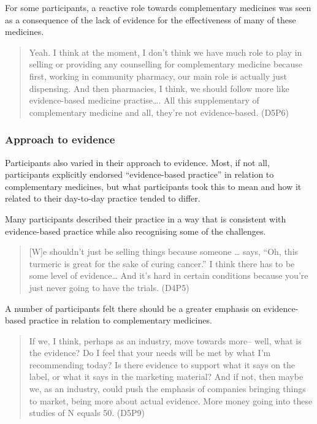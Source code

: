 \documentclass[11pt,a4paper]{article}
\begin{document}
For some participants, a reactive role towards complementary medicines
was seen as a consequence of the lack of evidence for the effectiveness
of many of these medicines.

\begin{quote}
Yeah. I think at the moment, I don't think we have much role to play in
selling or providing any counselling for complementary medicine because
first, working in community pharmacy, our main role is actually just
dispensing. And then pharmacies, I think, we should follow more like
evidence-based medicine practise\ldots{}. All this supplementary of
complementary medicine and all, they're not evidence-based. (D5P6)
\end{quote}

\subsubsection{Approach to evidence}\label{approach-to-evidence}

Participants also varied in their approach to evidence. Most, if not
all, participants explicitly endorsed ``evidence-based practice'' in
relation to complementary medicines, but what participants took this to
mean and how it related to their day-to-day practice tended to differ.

Many participants described their practice in a way that is consistent
with evidence-based practice while also recognising some of the
challenges.

\begin{quote}
{[}W{]}e shouldn't just be selling things because someone \ldots{} says,
``Oh, this turmeric is great for the sake of curing cancer.'' I think
there has to be some level of evidence\ldots{} And it's hard in certain
conditions because you're just never going to have the trials. (D4P5)
\end{quote}

A number of participants felt there should be a greater emphasis on
evidence-based practice in relation to complementary medicines.

\begin{quote}
If we, I think, perhaps as an industry, move towards more-- well, what
is the evidence? Do I feel that your needs will be met by what I'm
recommending today? Is there evidence to support what it says on the
label, or what it says in the marketing material? And if not, then maybe
we, as an industry, could push the emphasis of companies bringing things
to market, being more about actual evidence. More money going into these
studies of N equals 50. (D5P9)
\end{quote}
\end{document}
